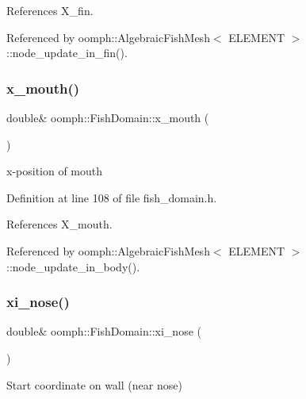 References X\+\_\+fin.



Referenced by oomph\+::\+Algebraic\+Fish\+Mesh$<$ E\+L\+E\+M\+E\+N\+T $>$\+::node\+\_\+update\+\_\+in\+\_\+fin().

\mbox{\label{classoomph_1_1FishDomain_adf87e9ae261cc914173bc18d7eb5bfd8}} 
\subsubsection{\texorpdfstring{x\+\_\+mouth()}{x\_mouth()}}
{\footnotesize\ttfamily double\& oomph\+::\+Fish\+Domain\+::x\+\_\+mouth (\begin{DoxyParamCaption}{ }\end{DoxyParamCaption})\hspace{0.3cm}{\ttfamily [inline]}}



x-\/position of mouth 



Definition at line 108 of file fish\+\_\+domain.\+h.



References X\+\_\+mouth.



Referenced by oomph\+::\+Algebraic\+Fish\+Mesh$<$ E\+L\+E\+M\+E\+N\+T $>$\+::node\+\_\+update\+\_\+in\+\_\+body().

\mbox{\label{classoomph_1_1FishDomain_a773b98977806c2b27531425ecf5e3f8e}} 
\subsubsection{\texorpdfstring{xi\+\_\+nose()}{xi\_nose()}}
{\footnotesize\ttfamily double\& oomph\+::\+Fish\+Domain\+::xi\+\_\+nose (\begin{DoxyParamCaption}{ }\end{DoxyParamCaption})\hspace{0.3cm}{\ttfamily [inline]}}



Start coordinate on wall (near nose) 



